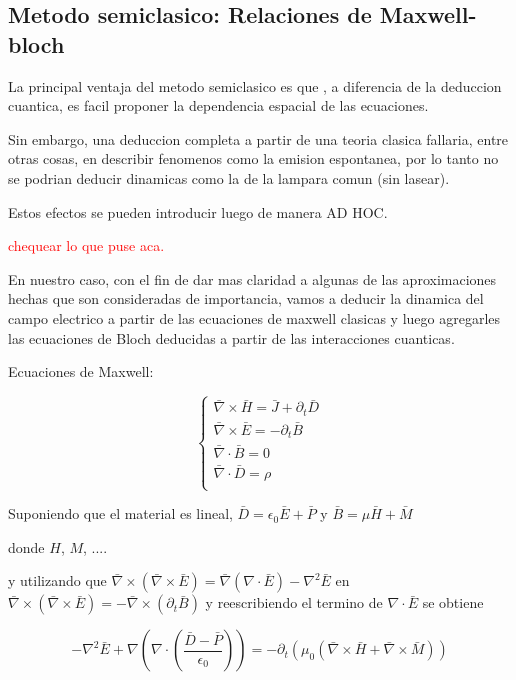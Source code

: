 \subsection{Metodo semiclasico: Relaciones de Maxwell-bloch}		

		La principal ventaja del metodo semiclasico es que , a diferencia de la deduccion cuantica, es facil proponer la dependencia espacial de las ecuaciones.
		
		Sin embargo, una deduccion completa a partir de una teoria clasica fallaria, entre otras cosas, en describir fenomenos como la emision espontanea, por lo tanto no se podrian deducir dinamicas como la de la lampara comun (sin lasear).
		
		Estos efectos se pueden introducir luego de manera AD HOC. 
		
		\textcolor{red}{chequear lo que puse aca.}
		
		En nuestro caso, con el fin de dar mas claridad a algunas de las aproximaciones hechas que son consideradas de importancia, vamos a deducir la dinamica del campo electrico a partir de las ecuaciones de maxwell clasicas y luego agregarles las ecuaciones de Bloch deducidas a partir de las interacciones cuanticas. 
		
		Ecuaciones de Maxwell:
		
		\begin{equation}
		\begin{cases}
		\bar{\nabla} \times \bar{H} = \bar{J} + \partial_{t} \bar{D}  \\
		\bar{\nabla} \times \bar{E} = -\partial_{t} \bar{B} \\
		\bar{\nabla} \cdot \bar{B}   = 0 \\
		\bar{\nabla} \cdot \bar{D}   = \rho \\
		\end{cases}
		\label{eq: Maxwell}
		\end{equation}  %
		
		Suponiendo que el material es lineal, $\bar{D}=\epsilon_0 \bar{E}+\bar{P}$ y $\bar{B}=\mu \bar{H} + \bar{M}$
		
		donde $H$, $M$, ....
		
		y utilizando que $\bar{\nabla} \times (\bar{\nabla} \times \bar{E} )= \bar{\nabla}(\nabla \cdot \bar{E}) - \nabla^2 \bar{E} $
		en $\bar{\nabla} \times (\bar{\nabla} \times \bar{E}) = -\bar{\nabla} \times (\partial_{t} \bar{B})$ y reescribiendo el termino de $\nabla \cdot \bar{E}$ se obtiene 
		
		\[ -\nabla^2 \bar{E} + \nabla (\nabla \cdot (\frac{\bar{D}-\bar{P}}{\epsilon_0}))=-\partial_t (\mu_0 (\bar{\nabla}\times\bar{H} + \bar{\nabla}\times\bar{M} ))  \]
		
